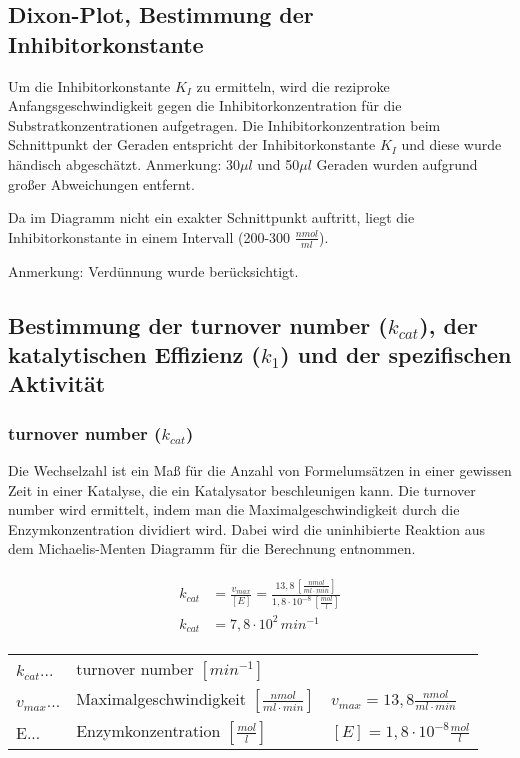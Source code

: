 \subsection{Dixon-Plot, Bestimmung der Inhibitorkonstante}

Um die Inhibitorkonstante $K_I$ zu ermitteln, wird die reziproke Anfangsgeschwindigkeit gegen die Inhibitorkonzentration für die Substratkonzentrationen aufgetragen. Die Inhibitorkonzentration beim Schnittpunkt der Geraden entspricht der Inhibitorkonstante $K_I$ und diese wurde händisch abgeschätzt. 
Anmerkung: 30$\mu l$ und 50$\mu l$ Geraden wurden aufgrund großer Abweichungen entfernt.


Da im Diagramm nicht ein exakter Schnittpunkt auftritt, liegt die Inhibitorkonstante in einem Intervall (200-300 $\frac{nmol}{ml}$).

Anmerkung: Verdünnung wurde berücksichtigt.

\subsection{Bestimmung der turnover number ($k_{cat}$), der katalytischen Effizienz ($k_1$) und der spezifischen Aktivität}

\subsubsection{turnover number ($k_{cat}$)}
Die Wechselzahl ist ein Maß für die Anzahl von Formelumsätzen in einer gewissen Zeit in einer Katalyse, die ein Katalysator beschleunigen kann.
Die turnover number wird ermittelt, indem man die Maximalgeschwindigkeit durch die Enzymkonzentration dividiert wird. Dabei wird die uninhibierte Reaktion aus dem Michaelis-Menten Diagramm für die Berechnung entnommen. 

\begin{align}
  \begin{split}
    k_{cat} &= \frac{v_{max}}{[E]}  = \frac{13,8 \, [\frac{nmol}{ml \cdot min}]}{1,8 \cdot 10^{-8} \, [\frac{mol}{l}]}\\
    k_{cat} &= 7,8 \cdot 10^2 \, min^{-1} 
  \end{split}
\end{align}

\begin{table}[H]
  \begin{tabular}{lll}
    $k_{cat}$...& turnover number $[min^{-1}]$ & \\
    $v_{max}$... & Maximalgeschwindigkeit $[\frac{nmol}{ml \cdot min}]$ & $v_{max} = 13,8 \frac{nmol}{ml \cdot min}$\\
    E... & Enzymkonzentration $[\frac{mol}{l}]$ & $[E] = 1,8 \cdot 10^{-8} \frac{mol}{l}$ \\
  \end{tabular}
\end{table}

